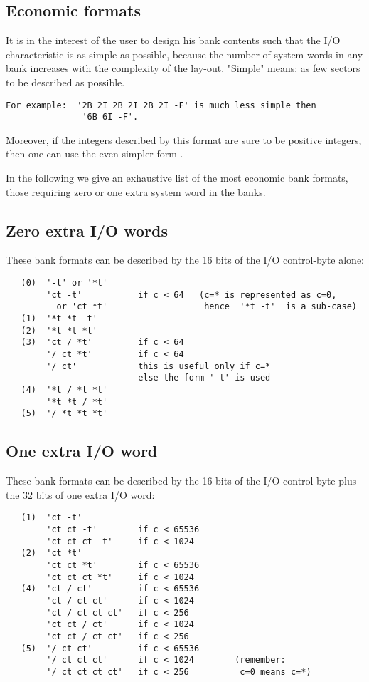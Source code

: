 \subsection*{Economic formats}

It is in the interest of the user to design his bank contents
such that the I/O characteristic is as simple as possible,
because the number of system words in any bank increases
with the complexity of the lay-out.
"Simple" means: as few sectors to be described as possible.
\begin{verbatim}
For example:  '2B 2I 2B 2I 2B 2I -F' is much less simple then
               '6B 6I -F'.
\end{verbatim} 
Moreover, if the integers described by this format are sure to
be positive integers, then one can use the even simpler form
.

In the following we give an exhaustive list of the most
economic bank formats, those requiring zero or one extra system
word in the banks.

\subsection*{Zero extra I/O words}

These bank formats can be described by the 16 bits of the
I/O control-byte alone:
\begin{verbatim}
   (0)  '-t' or '*t'
        'ct -t'           if c < 64   (c=* is represented as c=0,
          or 'ct *t'                   hence  '*t -t'  is a sub-case)
   (1)  '*t *t -t'
   (2)  '*t *t *t'
   (3)  'ct / *t'         if c < 64
        '/ ct *t'         if c < 64
        '/ ct'            this is useful only if c=*
                          else the form '-t' is used
   (4)  '*t / *t *t'
        '*t *t / *t'
   (5)  '/ *t *t *t'
\end{verbatim} 
\subsection*{One extra I/O word}

These bank formats can be described by the 16 bits of the
I/O control-byte plus the 32 bits of one extra I/O word:
\begin{verbatim}
   (1)  'ct -t'
        'ct ct -t'        if c < 65536
        'ct ct ct -t'     if c < 1024
   (2)  'ct *t'
        'ct ct *t'        if c < 65536
        'ct ct ct *t'     if c < 1024
   (4)  'ct / ct'         if c < 65536
        'ct / ct ct'      if c < 1024
        'ct / ct ct ct'   if c < 256
        'ct ct / ct'      if c < 1024
        'ct ct / ct ct'   if c < 256
   (5)  '/ ct ct'         if c < 65536
        '/ ct ct ct'      if c < 1024        (remember:
        '/ ct ct ct ct'   if c < 256          c=0 means c=*)
\end{verbatim} 


